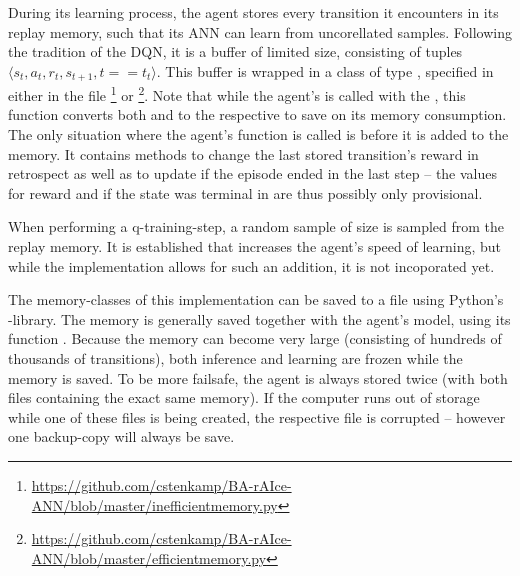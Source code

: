 
During its learning process, the agent stores every transition it encounters in its replay memory, such that its ANN can learn from uncorellated samples. Following the tradition of the DQN\cite{mnih_human-level_2015}, it is a buffer of limited size, consisting of tuples $\langle s_t, a_t, r_t, s_{t+1}, t==t_t \rangle$. This buffer is wrapped in a class of type , specified in either in the file \footnote{\url{https://github.com/cstenkamp/BA-rAIce-ANN/blob/master/inefficientmemory.py}} or \footnote{\url{https://github.com/cstenkamp/BA-rAIce-ANN/blob/master/efficientmemory.py}}. Note that while the agent's  is called with the , this function converts both  and  to the respective  to save on its memory consumption. The only situation where the agent's function  is called is before it is added to the memory. It contains methods to change the last stored transition's reward in retrospect as well as to update if the episode ended in the last step -- the values for reward and if the state was terminal in  are thus possibly only provisional.

When performing a q-training-step, a random sample of size  is sampled from the replay memory. It is established that \cite{schaul_prioritized_2015} increases the agent's speed of learning, but while the implementation allows for such an addition, it is not incoporated yet.

The memory-classes of this implementation can be saved to a file using Python's -library. The memory is generally saved together with the agent's model, using its function . Because the memory can become very large (consisting of hundreds of thousands of transitions), both inference and learning are frozen while the memory is saved. To be more failsafe, the agent is always stored twice (with both files containing the exact same memory). If the computer runs out of storage while one of these files is being created, the respective file is corrupted -- however one backup-copy will always be save.

